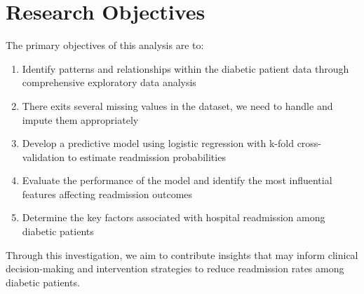 \section{Research Objectives}

The primary objectives of this analysis are to:

\begin{enumerate}
    \item Identify patterns and relationships within the diabetic patient data through comprehensive exploratory data analysis
    \item There exits several missing values in the dataset, we need to handle and impute them appropriately
    \item Develop a predictive model using logistic regression with k-fold cross-validation to estimate readmission probabilities
    \item Evaluate the performance of the model and identify the most influential features affecting readmission outcomes
    \item Determine the key factors associated with hospital readmission among diabetic patients

\end{enumerate}

Through this investigation, we aim to contribute insights that may inform clinical decision-making and intervention strategies to reduce readmission rates among diabetic patients. 